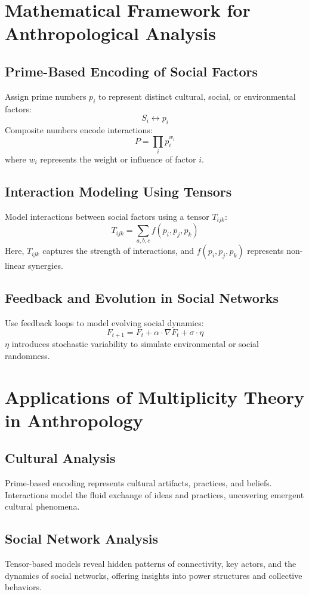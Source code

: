 \documentclass{article}
\theoremstyle{plain}
\begin{document}
\section{Mathematical Framework for Anthropological Analysis}

\subsection{Prime-Based Encoding of Social Factors}
Assign prime numbers $p_i$ to represent distinct cultural, social, or environmental factors:
\[
S_i \leftrightarrow p_i
\]
Composite numbers encode interactions:
\[
P = \prod_{i} p_i^{w_i}
\]
where $w_i$ represents the weight or influence of factor $i$.

\subsection{Interaction Modeling Using Tensors}
Model interactions between social factors using a tensor $T_{ijk}$:
\[
T_{ijk} = \sum_{a, b, c} f(p_i, p_j, p_k)
\]
Here, $T_{ijk}$ captures the strength of interactions, and $f(p_i, p_j, p_k)$ represents non-linear synergies.

\subsection{Feedback and Evolution in Social Networks}
Use feedback loops to model evolving social dynamics:
\[
F_{t+1} = F_t + \alpha \cdot \nabla F_t + \sigma \cdot \eta
\]
$\eta$ introduces stochastic variability to simulate environmental or social randomness.

\section{Applications of Multiplicity Theory in Anthropology}

\subsection{Cultural Analysis}
Prime-based encoding represents cultural artifacts, practices, and beliefs. Interactions model the fluid exchange of ideas and practices, uncovering emergent cultural phenomena.

\subsection{Social Network Analysis}
Tensor-based models reveal hidden patterns of connectivity, key actors, and the dynamics of social networks, offering insights into power structures and collective behaviors.
\end{document}
